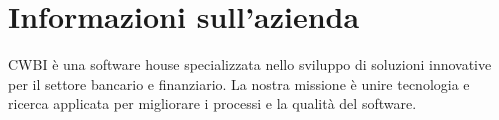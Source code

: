 \section*{Informazioni sull'azienda}
CWBI è una software house specializzata nello sviluppo di soluzioni innovative per il settore
bancario e finanziario. La nostra missione è unire tecnologia e ricerca applicata per
migliorare i processi e la qualità del software.

